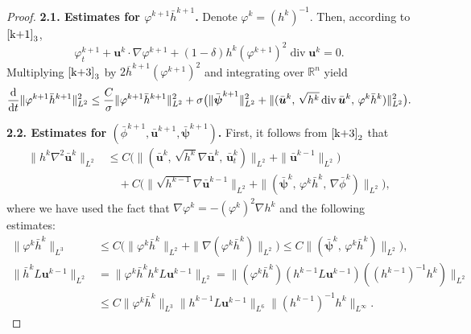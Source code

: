 \documentclass[11pt,reqno]{amsart}
\DeclareMathOperator{\diver}{\mathrm{div}}
\numberwithin{rk}{section}
\numberwithin{prop}{section}
\numberwithin{mydef}{section}
\numberwithin{lem}{section}
\numberwithin{equation}{section}
\numberwithin{thm}{section}
\begin{document}
\begin{proof}
\textbf{2.1. Estimates for $\varphi^{k+1}\bar{h}^{k+1}$.} Denote $\varphi^{k}=(h^{k})^{-1}$. Then, according to $\eqref{k+1}_3$, 
\begin{equation*}
\varphi^{k+1}_t+\boldsymbol{u}^k\cdot \nabla \varphi^{k+1}+(1-\delta)h^k (\varphi^{k+1})^2\diver\boldsymbol{u}^k=0.
\end{equation*}
Multiplying $\eqref{k+3}_3$ by $2\overline{h}^{k+1}(\varphi^{k+1})^2$ and integrating over $\mathbb{R}^n$ yield
\begin{equation}\label{go64aah}
\frac{\rm d}{{\rm d}t}\|\varphi^{k+1}\bar{h}^{k+1}\|^2_{L^2}\\ 
\leq \frac{C}{\sigma}\|\varphi^{k+1}\bar{h}^{k+1}\|^2_{L^2} + \sigma \big(\|\bar{\boldsymbol{\psi}}^{k+1}\|^2_{L^2}
+ \|(\bar{\boldsymbol{u}}^k,\, \sqrt{h^k}\diver\bar{\boldsymbol{u}}^k,\,\varphi^k\bar{h}^k)\|_{L^2}^2\big).
\end{equation}


\textbf{2.2. Estimates for $(\bar{\phi}^{k+1},\bar{\boldsymbol{u}}^{k+1},\bar{\boldsymbol{\psi}}^{k+1})$.} First, it follows from $\eqref{k+3}_2$ that
\begin{equation}\label{hubarr}
\begin{aligned}
\|h^k\nabla^2\bar{\boldsymbol{u}}^k\|_{L^2}& \leq C\big(\|(\bar{\boldsymbol{u}}^k,\,\sqrt{h^k}\nabla \bar{\boldsymbol{u}}^k,\,\bar{\boldsymbol{u}}^k_t)\|_{L^2}+\|\bar{\boldsymbol{u}}^{k-1}\|_{L^2}\big)\\
&\quad +C\big(\|\sqrt{h^{k-1}}\nabla\bar{\boldsymbol{u}}^{k-1}\|_{L^2}+\|(\bar{\boldsymbol{\psi}}^{k},\,\varphi^{k}\bar{h}^{k},\,\nabla \bar{\phi}^{k})\|_{L^2}\big),
\end{aligned}
\end{equation}
where we have used the fact that $\nabla \varphi^k=-(\varphi^k)^2\nabla h^k$ and the following estimates:
\begin{equation}\label{2Dxinfaxian}
\begin{aligned}
\|\varphi^k\bar{h}^{k}\|_{L^3}
&\leq C\big(\|\varphi^k\bar{h}^{k}\|_{L^2}+\|\nabla(\varphi^k\bar{h}^{k})\|_{L^2}\big)\leq C\|(\bar{\boldsymbol{\psi}}^{k},\,\varphi^{k}\bar{h}^{k})\|_{L^2}\big),\\
\|\bar{h}^{k}L\boldsymbol{u}^{k-1}\|_{L^2}&=\|\varphi^k\bar{h}^{k} h^k L\boldsymbol{u}^{k-1}\|_{L^2}=\|(\varphi^k\bar{h}^{k}) (h^{k-1} L\boldsymbol{u}^{k-1})((h^{k-1})^{-1}h^k)\|_{L^2}\\
& \leq C\|\varphi^k\bar{h}^{k}\|_{L^3}\|h^{k-1} L\boldsymbol{u}^{k-1}\|_{L^6}\|(h^{k-1})^{-1}h^k\|_{L^\infty}.
\end{aligned}
\end{equation}



\end{proof}
\end{document}
